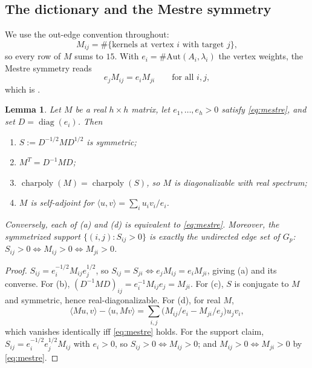 \documentclass[10pt,a4paper]{amsart}
\newtheorem{lemma}[theorem]{Lemma}
\newcommand{\Aut}{\mathrm{Aut}}
\DeclareMathOperator{\charp}{charpoly}
\DeclareMathOperator{\diag}{diag}
\providecommand{\charp}{\operatorname{charpoly}}
\begin{document}
	\subsection{The dictionary and the Mestre symmetry}
	\label{ss:dictionary}
	
	We use the out-edge convention throughout:
	\begin{equation}\label{eq:out-edge}
		M_{ij}=\#\{\text{kernels at vertex $i$ with target $j$}\},
	\end{equation}
	so every row of $M$ sums to $15$. With $e_i=\#\Aut(A_i,\lambda_i)$ the
	vertex weights, the Mestre symmetry reads
	\begin{equation}\label{eq:mestre}
		e_jM_{ij}=e_iM_{ji}\qquad\text{for all }i,j,
	\end{equation}
	which is \cite[Thm.~18(c)]{JordanZaytman}.
	
	\begin{lemma}\label{lem:mestre}
		Let $M$ be a real $h\times h$ matrix, let $e_1,\ldots,e_h>0$ satisfy
		\eqref{eq:mestre}, and set $D=\diag(e_i)$. Then
		\begin{enumerate}[label=\textup{(\alph*)},leftmargin=2.2em]
			\item $S:=D^{-1/2}MD^{1/2}$ is symmetric;
			\item $M^{T}=D^{-1}MD$;
			\item $\charp(M)=\charp(S)$, so $M$ is diagonalizable with real spectrum;
			\item $M$ is self-adjoint for
			$\langle u,v\rangle=\sum_i u_iv_i/e_i$.
		\end{enumerate}
		Conversely, each of \textup{(a)} and \textup{(d)} is equivalent to
		\eqref{eq:mestre}. Moreover, the symmetrized support
		$\{(i,j):S_{ij}>0\}$ is exactly the undirected edge set of $G_p$:
		$S_{ij}>0\iff M_{ij}>0\iff M_{ji}>0$.
	\end{lemma}
	
	\begin{proof}
		$S_{ij}=e_i^{-1/2}M_{ij}e_j^{1/2}$, so $S_{ij}=S_{ji}\iff
		e_jM_{ij}=e_iM_{ji}$, giving (a) and its converse. For (b),
		$(D^{-1}MD)_{ij}=e_i^{-1}M_{ij}e_j=M_{ji}$. For (c), $S$ is conjugate to
		$M$ and symmetric, hence real-diagonalizable. For (d), for real $M$,
		\[
		\langle Mu,v\rangle-\langle u,Mv\rangle
		=\sum_{i,j}\bigl(M_{ij}/e_i-M_{ji}/e_j\bigr)u_jv_i,
		\]
		which vanishes identically iff \eqref{eq:mestre} holds. For the support
		claim, $S_{ij}=e_i^{-1/2}e_j^{1/2}M_{ij}$ with $e_i>0$, so
		$S_{ij}>0\iff M_{ij}>0$; and $M_{ij}>0\iff M_{ji}>0$ by \eqref{eq:mestre}.
	\end{proof}
	
\end{document}

